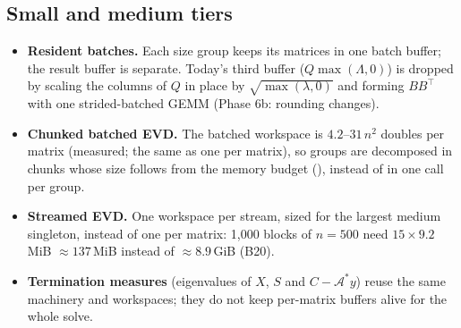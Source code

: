 \documentclass[11pt]{article}
\newcommand{\Ad}{\mathcal{A}^{*}}
\begin{document}
\subsection{Small and medium tiers}\label{sec:batched}
\begin{itemize}
  \item \textbf{Resident batches.} Each size group keeps its matrices in one batch buffer; the result buffer is
  separate. Today's third buffer ($Q\max(\Lambda,0)$) is dropped by scaling the columns of $Q$ in place by
  $\sqrt{\max(\lambda,0)}$ and forming $BB^\top$ with one strided-batched GEMM (Phase 6b: rounding changes).
  \item \textbf{Chunked batched EVD.} The batched workspace is $4.2$--$31\,n^2$ doubles per matrix (measured;
  the same as one  per matrix), so groups are decomposed in chunks whose size follows from the
  memory budget (), instead of in one call per group.
  \item \textbf{Streamed EVD.} One workspace per stream, sized for the largest medium singleton, instead of
  one per matrix: 1{,}000 blocks of $n = 500$ need $15\times9.2$\,MiB $\approx137$\,MiB instead of $\approx8.9$\,GiB (B20).
  \item \textbf{Termination measures} (eigenvalues of $X$, $S$ and $C-\Ad y$) reuse the same machinery and
  workspaces; they do not keep per-matrix buffers alive for the whole solve.
\end{itemize}
\end{document}
